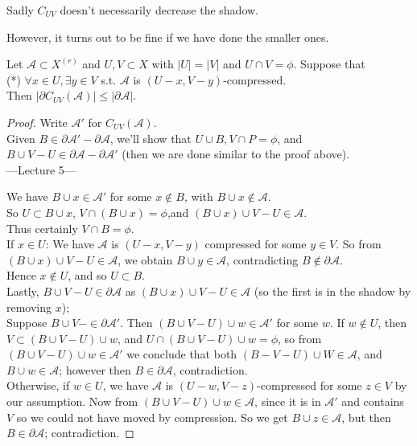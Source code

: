 \documentclass[a4paper]{article}
\begin{document}
Sadly $C_{UV}$ doesn't necessarily decrease the shadow.

However, it turns out to be fine if we have done the smaller ones.

\begin{prop}
    Let $\mathcal{A} \subset X^{(r)}$ and $U,V \subset X$ with $|U|=|V|$ and $U \cap V = \phi$. Suppose that\\
    (*) $\forall x \in U, \exists y \in V$ s.t. $\mathcal{A}$ is $(U-x,V-y)$-compressed.\\
    Then $|\partial C_{UV}(\mathcal{A})|\leq |\partial \mathcal{A}|$.
    \begin{proof}
        Write $\mathcal{A}'$ for $C_{UV}(\mathcal{A})$.\\
        Given $B \in \partial \mathcal{A}' - \partial \mathcal{A}$, we'll show that $U \cup B, V \cap P = \phi$, and $B \cup V - U \in \partial \mathcal{A} - \partial \mathcal{A}'$ (then we are done similar to the proof above).\\

---Lecture 5---

        We have $B \cup x \in \mathcal{A}'$ for some $x \not\in B$, with $B \cup x \not\in \mathcal{A}$.\\
        So $U \subset B \cup x$, $V \cap (B \cup x) = \phi$,and $(B \cup x) \cup V - U \in \mathcal{A}$.\\
        Thus certainly $V \cap B = \phi$.\\
        If $x \in U$: We have $\mathcal{A}$ is $(U-x,V-y)$ compressed for some $y \in V$. So from $(B \cup x) \cup V - U \in \mathcal{A}$, we obtain $B \cup y \in \mathcal{A}$, contradicting $B \not\in \partial \mathcal{A}$.\\
        Hence $x \not\in U$, and so $U \subset B$.\\
        Lastly, $B \cup V - U \in \partial \mathcal{A}$ as $(B \cup x) \cup V - U \in \mathcal{A}$ (so the first is in the shadow by removing $x$);\\
        Suppose $B \cup V- \in \partial \mathcal{A}'$. Then $(B \cup V - U) \cup w \in \mathcal{A}'$ for some $w$. If $w \not\in U$, then $V \subset (B \cup V - U) \cup w$, and $U \cap (B\cup V-U) \cup w = \phi$, so from $(B\cup V - U) \cup w \in \mathcal{A}'$ we conclude that both $(B-V-U) \cup W \in \mathcal{A}$, and $B \cup w \in \mathcal{A}$; however then $B \in \partial \mathcal{A}$, contradiction.\\
        Otherwise, if $w \in U$, we have $\mathcal{A}$ is $(U-w,V-z)$-compressed for some $z \in V$ by our assumption. Now from $(B \cup V-U) \cup w \in\mathcal{A}$, since it is in $\mathcal{A}'$ and contains $V$ so we could not have moved by compression. So we get $B \cup z \in \mathcal{A}$, but then $B \in \partial \mathcal{A}$; contradiction.
    \end{proof}
\end{prop}
\end{document}
